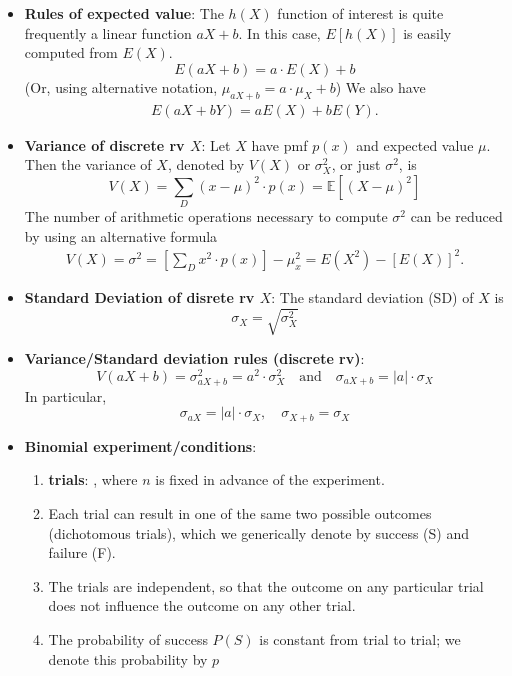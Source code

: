 \documentclass{report}
\begin{document}
\begin{itemize}
    \item \textbf{Rules of expected value}:
        The \(h(X)\) function of interest is quite frequently a linear function \(aX + b\). In this case, \(E[h(X)]\) is easily computed from \(E(X)\).
        \[
            E(aX + b) = a \cdot E(X) + b
        \]
        (Or, using alternative notation, \(\mu_{aX+b} = a \cdot \mu_X + b\))
        \bigbreak \noindent 
        We also have
        \begin{align*}
            E(aX + bY) = aE(X) + bE(Y)
        .\end{align*}
    \item \textbf{Variance of discrete rv $X$}:
        Let \( X \) have pmf \( p(x) \) and expected value \( \mu \). Then the variance of \( X \), denoted by \( V(X) \) or \( \sigma_X^2 \), or just \( \sigma^2 \), is
        \[
            V(X) = \sum_{D} (x - \mu)^2 \cdot p(x) = \mathbb{E}[(X - \mu)^2]
        \]
        \bigbreak \noindent 
        The number of arithmetic operations necessary to compute $\sigma^{2}$ can be reduced by using an alternative formula
        \begin{align*}
            V(X) = \sigma^{2} = \left[\sum_D x^{2} \cdot p(x)\right] - \mu_{x}^{2} = E(X^{2}) - [E(X)]^{2}
        .\end{align*}
    \item \textbf{Standard Deviation of disrete rv $X$}:
        The standard deviation (SD) of \( X \) is
        \[
            \sigma_X = \sqrt{\sigma_X^2}
        \]
    \item \textbf{Variance/Standard deviation rules (discrete rv)}:
        \[
            V(aX + b) = \sigma_{aX+b}^2 = a^2 \cdot \sigma_X^2 \quad \text{and} \quad \sigma_{aX+b} = |a| \cdot \sigma_X
        \]
        In particular,
        \[
            \sigma_{aX} = |a| \cdot \sigma_X, \quad \sigma_{X+b} = \sigma_X
        \]
    \item \textbf{Binomial experiment/conditions}:
        \begin{enumerate}
            \item \textbf{trials}: , where $n$ is fixed in advance of the experiment.
            \item Each trial can result in one of the same two possible outcomes (dichotomous trials), which we generically denote by success (S) and failure (F).
            \item The trials are independent, so that the outcome on any particular trial does not influence the outcome on any other trial.
            \item The probability of success $P(S)$ is constant from trial to trial; we denote this probability by $p$

\end{enumerate}
\end{itemize}
\end{document}
